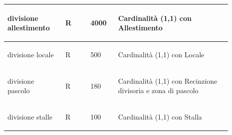 \documentclass[12pt,a4paper]{article}
\begin{document}
\begin{center}
\begin{longtable}{|p{0.23\linewidth}|p{0.1\linewidth}|p{0.11\linewidth}|p{0.45\linewidth}|}
\hline
divisione allestimento 				& \begin{center}
\vspace{-25pt}R
\end{center}
					& \begin{center}
					\vspace{-25pt}4000\end{center}
					& \begin{flushleft}\vspace{-25pt} Cardinalità (1,1) con Allestimento \end{flushleft}\\ 

\hline
divisione locale 				& \begin{center}
\vspace{-25pt}R
\end{center}
					& \begin{center}
					\vspace{-25pt}500\end{center}
					& \begin{flushleft}\vspace{-25pt} Cardinalità (1,1) con Locale \end{flushleft}\\ 

\hline
divisione pascolo 				& \begin{center}
\vspace{-25pt}R
\end{center}
					& \begin{center}
					\vspace{-25pt}180\end{center}
					& \begin{flushleft}\vspace{-25pt} Cardinalità (1,1) con Recinzione divisoria e zona di pascolo \end{flushleft}\\ 

\hline
divisione stalle 				& \begin{center}
\vspace{-25pt}R
\end{center}
					& \begin{center}
					\vspace{-25pt}100\end{center}
					& \begin{flushleft}\vspace{-25pt} Cardinalità (1,1) con Stalla \end{flushleft}\\ 


\end{longtable}
\end{center}
\end{document}
